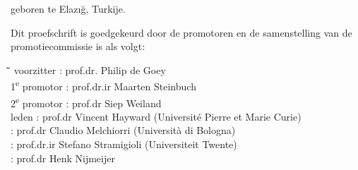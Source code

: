 {\begin{center}
\vspace{15mm}

geboren te Elazığ, Turkije.
\end{center}

\newpage %
\thispagestyle{empty}
\noindent Dit proefschrift is goedgekeurd door de promotoren en de samenstelling van de 
promotiecommissie is als volgt:
\bigskip{}
\noindent
\begin{flushleft}
\begin{tabbing}
\hspace*{20mm}\=\hspace{1em}\=\hspace{15mm}\=\hspace{35mm}\=\kill
voorzitter                     \> : \> prof.dr.   \> Philip de Goey                                           \\
1\textsuperscript{e} promotor  \> : \> prof.dr.ir \> Maarten Steinbuch                                        \\
2\textsuperscript{e} promotor  \> : \> prof.dr	  \>  Siep Weiland                                            \\
leden                          \> : \> prof.dr    \> Vincent Hayward    \> (Université Pierre et Marie Curie) \\
                               \> : \> prof.dr    \> Claudio Melchiorri \> (Università di Bologna)            \\
                               \> : \> prof.dr.ir \> Stefano Stramigioli\> (Universiteit Twente)              \\
                               \> : \> prof.dr    \> Henk Nijmeijer                                           \\
\end{tabbing}
\end{flushleft}
}
\newpage
\thispagestyle{empty}
\begin{center}
    \textbf{\huge \ilhant}
\end{center}

